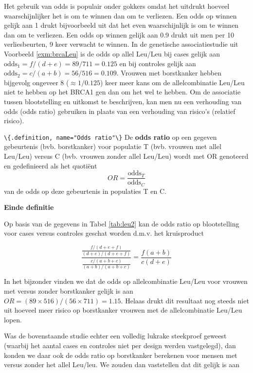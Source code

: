 \documentclass[
  12pt,dutch,coursenotes]{book}
\newcommand{\passthrough}[1]{#1}
\begin{document}
Het gebruik van odds is populair onder gokkers omdat het uitdrukt hoeveel
waarschijnlijker het is om te winnen dan om te verliezen. Een odds op winnen
gelijk aan 1 drukt bijvoorbeeld uit dat het even waarschijnlijk is om te
winnen dan om te verliezen. Een odds op winnen gelijk aan 0.9 drukt uit men
per 10 verliesbeurten, 9 keer verwacht te winnen. In de genetische associatiestudie uit Voorbeeld \ref{exm:brcaLeu}
is de odds op allel Leu/Leu bij cases gelijk aan
\(\mbox{odds}_1=f/(d+e)=89/711=0.125\) en bij controles gelijk aan \(\mbox{odds}_2=c/(a+b)=56/516=0.109\). Vrouwen met borstkanker hebben bijgevolg ongeveer 8 (\(\approx 1/0.125\)) keer meer kans om de allelcombinatie Leu/Leu niet te hebben op het BRCA1 gen dan om het wel te hebben.
Om de associatie tussen blootstelling
en uitkomst te beschrijven, kan men nu een verhouding van odds (odds ratio)
gebruiken in plaats van een verhouding van risico's (relatief risico).

\passthrough{\lstinline!\{.definition, name="Odds ratio"\}!}
De \textbf{odds ratio} op een gegeven gebeurtenis (bvb. borstkanker) voor populatie T (bvb. vrouwen met allel Leu/Leu) versus C (bvb. vrouwen zonder allel Leu/Leu) wordt met OR genoteerd en gedefinieerd als het quotiënt
\begin{equation*}
OR=\frac{\mbox{odds}_T}{\mbox{odds}_C}
\end{equation*}
van de odds op deze gebeurtenis in populaties T en C.

\textbf{Einde definitie}

Op basis van de gegevens in Tabel \ref{tab:leu2} kan de odds ratio op
blootstelling voor cases versus controles geschat worden d.m.v. het kruisproduct

\begin{equation*}
\frac{ \frac{ f/(d+e+f)}{(d+e)/(d+e+f)} }{ \frac{c/(a+b+c)}{(a+b)/(a+b+c)}} = \frac{f(a+b)}{c (d+e)}
\end{equation*}

In het bijzonder vinden we dat de odds op allelcombinatie Leu/Leu voor vrouwen met versus zonder borstkanker gelijk is aan \(OR=(89\times 516)/(56\times 711)=1.15\). Helaas drukt dit resultaat nog steeds
niet uit hoeveel meer risico op borstkanker vrouwen met de allelcombinatie Leu/Leu lopen.

Was de bovenstaande studie echter een volledig lukrake steekproef geweest
(waarbij het aantal cases en controles niet per design werden vastgelegd),
dan konden we daar ook de odds ratio op borstkanker berekenen voor mensen
met versus zonder het allel Leu/leu. We zouden dan vaststellen dat dit gelijk is
aan
\end{document}
